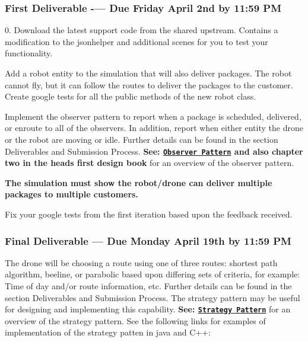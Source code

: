 \subsubsection*{First Deliverable -\/--- Due Friday April 2nd by 11\+:59 PM}

0. Download the latest support code from the shared upstream. Contains a modification to the jsonhelper and additional scenes for you to test your functionality.


\begin{DoxyEnumerate}
\item Add a robot entity to the simulation that will also deliver packages. The robot cannot fly, but it can follow the routes to deliver the packages to the customer. Create google tests for all the public methods of the new robot class.
\item Implement the observer pattern to report when a package is scheduled, delivered, or enroute to all of the observers. In addition, report when either entity the drone or the robot are moving or idle. Further details can be found in the section Deliverables and Submission Process. {\bfseries See\+: \href{https://www.geeksforgeeks.org/observer-pattern-set-1-introduction/}{\tt Observer Pattern} and also chapter two in the heads first design book} for an overview of the observer pattern.
\item {\bfseries The simulation must show the robot/drone can deliver multiple packages to multiple customers.}
\item Fix your google tests from the first iteration based upon the feedback received.
\end{DoxyEnumerate}

\subsubsection*{Final Deliverable --- Due Monday April 19th by 11\+:59 PM}


\begin{DoxyEnumerate}
\item The drone will be choosing a route using one of three routes\+: shortest path algorithm, beeline, or parabolic based upon differing sets of criteria, for example\+: Time of day and/or route information, etc. Further details can be found in the section Deliverables and Submission Process. The strategy pattern may be useful for designing and implementing this capability. {\bfseries See\+: \href{https://www.geeksforgeeks.org/strategy-pattern-set-1/}{\tt Strategy Pattern}} for an overview of the strategy pattern. See the following links for examples of implementation of the strategy patten in java and C++\+:
\end{DoxyEnumerate}

